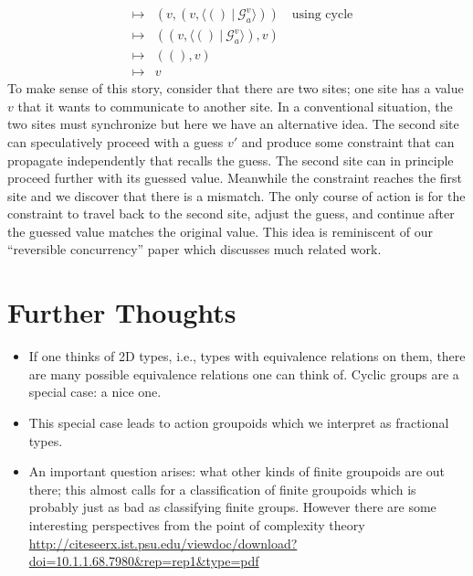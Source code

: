 \documentclass{article}
\newcommand{\G}{\mathcal{G}}
\newcommand{\fv}[2]{\langle #1 ~|~ #2 \rangle}
\begin{document}
\begin{itemize}
\[\begin{array}{rcl}
&\mapsto& (v , (v , \fv{()}{\G_a^{v}})) \quad \mbox{using~cycle} \\
&\mapsto& ((v , \fv{()}{\G_a^{v}}), v)  \\
&\mapsto& ((), v) \\
&\mapsto& v
\end{array}\]
To make sense of this story, consider that there are two sites; one site has a value $v$ that it wants to communicate to another site. In a conventional situation, the two sites must synchronize but here we have an alternative idea. The second site can speculatively proceed with a guess $v'$ and produce some constraint that can propagate independently that recalls the guess. The second site can in principle proceed further with its guessed value. Meanwhile the constraint reaches the first site and we discover that there is a mismatch. The only
course of action is for the constraint to travel back to the second site, adjust the guess, and continue after the guessed value matches the original value. This idea is reminiscent of our ``reversible concurrency'' paper which discusses much related work. 
\end{itemize}

\section{Further Thoughts}

\begin{itemize}
\item If one thinks of 2D types, i.e., types with equivalence
  relations on them, there are many possible equivalence relations one
  can think of. Cyclic groups are a special case: a nice one.

\item This special case leads to action groupoids which we interpret
  as fractional types. 

\item An important question arises: what other kinds of finite
  groupoids are out there; this almost calls for a classification of
  finite groupoids which is probably just as bad as classifying finite
  groups. However there are some interesting perspectives from the
  point of complexity theory
  \url{http://citeseerx.ist.psu.edu/viewdoc/download?doi=10.1.1.68.7980&rep=rep1&type=pdf}

\end{itemize}

\end{document}
